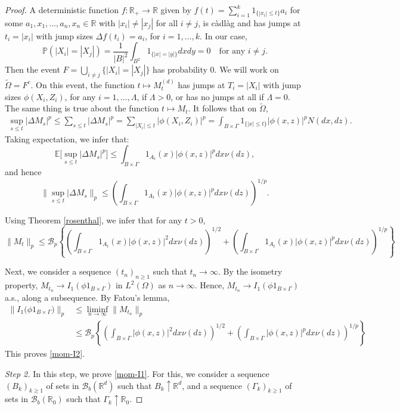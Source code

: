 \documentclass[12pt]{article}
\def\cB{\mathcal{B}}
\def\bE{\mathbb{E}}
\def\bP{\mathbb{P}}
\def\bR{\mathbb{R}}
\begin{document}
\begin{proof}
A deterministic function $f:\bR_{+} \to \bR$ given by $f(t)=\sum_{i=1}^k 1_{\{|x_i|\leq t\}} a_i$ for some $a_1,x_1,\ldots,a_n,x_n \in \bR$ with $|x_i| \not=|x_j|$ for all $i \not=j$, is c\`adl\`ag and has jumps at $t_i=|x_i|$ with jump sizes $\Delta f(t_i)=a_i$, for $i=1,\ldots,k$. In our case, 
\[
\bP(|X_i|=|X_j|)=\frac{1}{|B|^2}  \int_{B^2} 1_{\{|x|=|y|\}} dxdy=0 \quad \mbox{for any $i\not=j$}.
\]
Then the event $F=\bigcup_{i\not=j}\{|X_i|=|X_j|\}$ has probability 0. We will work on  $\widetilde{\Omega}=F^c$. On this event, the function $t\mapsto M_t^{(d)}$ has jumps at $T_i=|X_i|$ with jump sizes $\phi(X_i,Z_i)$, for any $i=1,\ldots,\Lambda$, if $\Lambda>0$, or has no jumps at all if $\Lambda=0$. The same thing is true about the function $t \mapsto M_t$. It follows that on $\widetilde{\Omega}$,
\begin{align*}
\sup_{s\leq t} |\Delta M_s|^p \leq  \sum_{s\leq t} |\Delta M_s |^p=\sum_{|X_i|\leq t} |\phi(X_i,Z_i)|^p=\int_{B \times \Gamma} 1_{\{|x|\leq t\}} |\phi(x,z)|^p N(dx,dz).
\end{align*}
Taking expectation, we infer that:
\[
\bE\big[ \sup_{s\leq t} |\Delta M_s|^p\big]\leq \int_{B \times \Gamma} 1_{A_t}(x) |\phi(x,z)|^p dx\nu(dz),
\]
and hence
\[
\big\|\sup_{s\leq t} |\Delta M_s\big\|_p \leq \left( \int_{B \times \Gamma} 1_{A_t}(x) |\phi(x,z)|^p dx\nu(dz) \right)^{1/p}.
\]

Using Theorem \ref{rosenthal}, we infer that for any $t>0$,
\[
\|M_t\|_p \leq \cB_p \left\{ \left( \int_{B \times \Gamma} 1_{A_t}(x) |\phi(x,z)|^2 dx\nu(dz) \right)^{1/2}+ \left( \int_{B \times \Gamma} 1_{A_t}(x) |\phi(x,z)|^p dx\nu(dz) \right)^{1/p} \right\}
\]

Next, we consider a sequence $(t_n)_{n\ge 1}$ such that $t_n \to \infty$. By the isometry property, $M_{t_n} \to I_1(\phi 1_{B \times \Gamma})$ in $L^2(\Omega)$ as $n \to \infty$. Hence,  $M_{t_n} \to I_1(\phi 1_{B \times \Gamma})$ a.s., along a subsequence. By Fatou's lemma,
\begin{align*}
\|I_1\big(\phi 1_{B \times \Gamma}\big)\|_p & \leq \liminf_{n \to \infty}\|M_{t_n}\|_p \\
& \leq \cB_p \left\{ \left( \int_{B \times \Gamma} |\phi(x,z)|^2 dx\nu(dz) \right)^{1/2}+ \left( \int_{B \times \Gamma} |\phi(x,z)|^p dx\nu(dz) \right)^{1/p} \right\}
\end{align*}
This proves \eqref{mom-I2}.

\medskip

{\em Step 2.} In this step, we prove \eqref{mom-I1}. For this, we consider a sequence $(B_k)_{k\geq 1}$ of sets in $\cB_b(\bR^d)$ such that $B_k \uparrow \bR^d$,
and a sequence $(\Gamma_k)_{k\geq 1}$ of sets in $\cB_b(\bR_0)$ such that $\Gamma_k \uparrow \bR_0$.


\end{proof}
\end{document}
